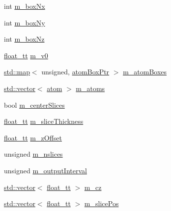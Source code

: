 \begin{DoxyCompactItemize}
\item 
int \hyperlink{class_q_s_t_e_m_1_1_c_potential_a069ef251874998b274ed41a973bb0280}{m\-\_\-box\-Nx}
\item 
int \hyperlink{class_q_s_t_e_m_1_1_c_potential_a17fbaa483bd98f3776ad078f13952aeb}{m\-\_\-box\-Ny}
\item 
int \hyperlink{class_q_s_t_e_m_1_1_c_potential_af9a23717c144de0075db03ec0f8eeac0}{m\-\_\-box\-Nz}
\item 
\hyperlink{namespace_q_s_t_e_m_a915d7caa497280d9f927c4ce8d330e47}{float\-\_\-tt} \hyperlink{class_q_s_t_e_m_1_1_c_potential_a9f9f3123596298af6e24256ead39085c}{m\-\_\-v0}
\item 
\hyperlink{_displacement_params_8m_af619c74fd72bdb64d115463dff2720cd}{std\-::map}$<$ unsigned, \hyperlink{namespace_q_s_t_e_m_a834093bc53d08abeb557de742e38541e}{atom\-Box\-Ptr} $>$ \hyperlink{class_q_s_t_e_m_1_1_c_potential_af06c591a7de14cc9644892953afbbddf}{m\-\_\-atom\-Boxes}
\item 
\hyperlink{qmb_8m_af54b69a32590de218622e869b06b47b3}{std\-::vector}$<$ \hyperlink{namespace_q_s_t_e_m_a402dabc31a7a1fe906d0cdd138c69686}{atom} $>$ \hyperlink{class_q_s_t_e_m_1_1_c_potential_ad811b5a6c1770a7b4cb9a86dd4f099b4}{m\-\_\-atoms}
\item 
bool \hyperlink{class_q_s_t_e_m_1_1_c_potential_aff9bc10e6c7a921d2a0ad11ae460a511}{m\-\_\-center\-Slices}
\item 
\hyperlink{namespace_q_s_t_e_m_a915d7caa497280d9f927c4ce8d330e47}{float\-\_\-tt} \hyperlink{class_q_s_t_e_m_1_1_c_potential_a0a72848b6d447e0a7ba5143f7b302cc7}{m\-\_\-slice\-Thickness}
\item 
\hyperlink{namespace_q_s_t_e_m_a915d7caa497280d9f927c4ce8d330e47}{float\-\_\-tt} \hyperlink{class_q_s_t_e_m_1_1_c_potential_a81aacf38febd7cdb6bc000315c9151b6}{m\-\_\-z\-Offset}
\item 
unsigned \hyperlink{class_q_s_t_e_m_1_1_c_potential_a6c74dc1b53754b4415d494c012d8044f}{m\-\_\-nslices}
\item 
unsigned \hyperlink{class_q_s_t_e_m_1_1_c_potential_af35e6474bd6357b24f88b29dd5a1a1d2}{m\-\_\-output\-Interval}
\item 
\hyperlink{qmb_8m_af54b69a32590de218622e869b06b47b3}{std\-::vector}$<$ \hyperlink{namespace_q_s_t_e_m_a915d7caa497280d9f927c4ce8d330e47}{float\-\_\-tt} $>$ \hyperlink{class_q_s_t_e_m_1_1_c_potential_a8c401afb43416b1629c43897faa16b16}{m\-\_\-cz}
\item 
\hyperlink{qmb_8m_af54b69a32590de218622e869b06b47b3}{std\-::vector}$<$ \hyperlink{namespace_q_s_t_e_m_a915d7caa497280d9f927c4ce8d330e47}{float\-\_\-tt} $>$ \hyperlink{class_q_s_t_e_m_1_1_c_potential_ad44ace45b9cdf8aa02f01a8e6eaefff6}{m\-\_\-slice\-Pos}

\end{DoxyCompactItemize}
